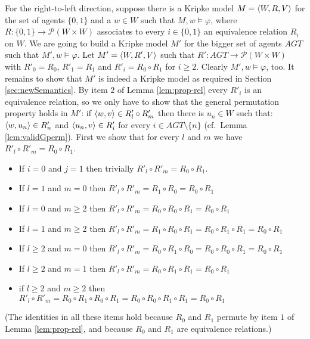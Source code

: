 \documentclass{article}
\renewcommand{\phi}{\varphi}
\newcommand{\agtset}{\ensuremath{\mathit{AGT}}}
\begin{document}
For the right-to-left direction, suppose there is a Kripke model
$M = \langle W, R, V \rangle $ for the set of agents $\{0,1\}$ and a $w \in W $ such that
$M,w \models \phi $, where $R : \{0,1\} \longrightarrow \mathcal{P}(W \times W)$
associates to every $i \in \{0,1\}$ an equivalence relation $R_i$ on $W$.
We are going to build a Kripke model $M'$ for the bigger set of agents $\agtset$
such that $M',w \models \phi$.
Let $M' = \langle W, R', V \rangle $ such that
$R' : \agtset \longrightarrow \mathcal{P}(W \times W)$ with
$R'_0 = R_0 $,
$R'_1 = R_1 $ and
$R'_i = R_0 \circ R_1 $ for $i \geq 2$.
Clearly $M',w \models \phi$, too.
It remains to show that $M' $ is indeed a Kripke model
as required in Section \ref{sec:newSemantics}.
By item $2$ of Lemma \ref{lem:prop-rel}
every $R'_i $ is an equivalence relation, so we only have to show that
the general permutation property holds in $M'$:
if $\langle w,v \rangle \in R'_l \circ R'_m $ then
there is $u_n \in W$ such that:
$\langle w,u_n \rangle \in R'_n $ and $\langle u_n,v \rangle \in R'_i $
for every $i \in \agtset \setminus \{n\} $
(cf.\ Lemma \ref{lem:validGperm}).
First we show that for every $l$ and $m$
we have $R'_l \circ R'_m = R_0 \circ R_1$.
\begin{itemize}
\item If $i=0$ and $j=1$ then trivially
$R'_l \circ R'_m = R_0 \circ R_1$.
\item If $l=1$ and $m=0$ then
$R'_l \circ R'_m = R_1 \circ R_0
                 = R_0 \circ R_1 $
\item If $l=0$ and $m\geq 2$ then
$R'_l \circ R'_m = R_0 \circ R_0 \circ R_1
                 = R_0 \circ R_1 $
\item If $l=1$ and $m\geq 2$ then
$R'_l \circ R'_m = R_1 \circ R_0 \circ R_1
                 = R_0 \circ R_1 \circ R_1
                 = R_0 \circ R_1 $
\item If $l\geq 2$ and $m=0$ then
$R'_l \circ R'_m = R_0 \circ R_1 \circ R_0
                 = R_0 \circ R_0 \circ R_1
                 = R_0 \circ R_1  $
\item If $l\geq 2$ and $m=1$ then
$R'_l \circ R'_m = R_0 \circ R_1 \circ R_1
                 = R_0 \circ R_1  $
\item if $l\geq 2$ and $m\geq 2$ then
$R'_l \circ R'_m = R_0 \circ R_1 \circ R_0 \circ R_1
                 = R_0 \circ R_0 \circ R_1 \circ R_1
                 = R_0 \circ R_1  $
\end{itemize}
(The identities in all these items hold because
$R_0$ and $R_1$ permute by item $1$ of Lemma \ref{lem:prop-rel}, and
because $R_0 $ and $R_1 $ are equivalence relations.)
\end{document}
